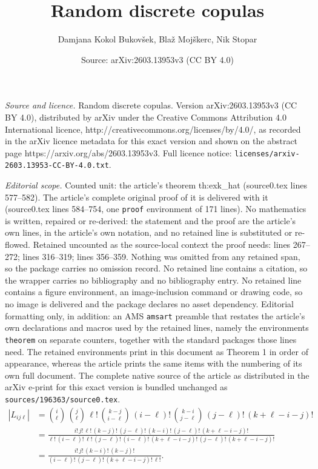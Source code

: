 \documentclass[10pt,a4paper]{amsart}
\title{Random discrete copulas}
\author{Damjana Kokol Bukov\v{s}ek, Bla\v{z} Moj\v{s}kerc, Nik Stopar}
\date{Source: arXiv:2603.13953v3 (CC BY 4.0)}
\begin{document}
\maketitle

\noindent\emph{Source and licence.} Random discrete copulas. Version arXiv:2603.13953v3 (CC BY 4.0), distributed by arXiv under the Creative Commons Attribution 4.0 International licence, http://creativecommons.org/licenses/by/4.0/, as recorded in the arXiv licence metadata for this exact version and shown on the abstract page https://arxiv.org/abs/2603.13953v3. Full licence notice: \texttt{licenses/arxiv-2603.13953-CC-BY-4.0.txt}.\par\smallskip

\noindent\textit{Editorial scope.} Counted unit: the article's theorem th:exk\_hat (source0.tex lines 577--582). The article's complete original proof of it is delivered with it (source0.tex lines 584--754, one \texttt{proof} environment of 171 lines). No mathematics is written, repaired or re-derived: the statement and the proof are the article's own lines, in the article's own notation, and no retained line is substituted or re-flowed.  Retained uncounted as the source-local context the proof needs: lines 267--272; lines 316--319; lines 356--359.  Nothing was omitted from any retained span, so the package carries no omission record.  No retained line contains a citation, so the wrapper carries no bibliography and no bibliography entry.  No retained line contains a figure environment, an image-inclusion command or drawing code, so no image is delivered and the package declares no asset dependency.  Editorial formatting only, in addition: an AMS \texttt{amsart} preamble that restates the article's own declarations and macros used by the retained lines, namely the environments \texttt{theorem} on separate counters, together with the standard packages those lines need.  The retained environments print in this document as Theorem 1 in order of appearance, whereas the article prints the same items with the numbering of its own full document.  The complete native source of the article as distributed in the arXiv e-print for this exact version is bundled unchanged as \texttt{sources/196363/source0.tex}.
\begin{align}
    |L_{ij\ell}|
    &= \binom{i}{\ell} \, \binom{j}{\ell} \, \ell! \, \binom{k-j}{i-\ell} \, (i-\ell)! \, \binom{k-i}{j-\ell} \, (j-\ell)! \,(k+\ell-i-j)! \nonumber\\
    &= \frac{i! \,j! \, \ell!\, (k-j)! \,(j-\ell)! \,(k-i)! \,(j-\ell)! \, (k+\ell-i-j)!}{\ell! \, (i-\ell)! \, \ell! \, (j-\ell)! \, (i-\ell)! \, (k+\ell-i-j)! \, (j-\ell)! \, (k+\ell-i-j)!} \label{eq:L_ijl_size}\\
    &= \frac{i! \, j! \, (k-i)! \, (k-j)!}{(i-\ell)! \, (j-\ell)! \, (k+\ell-i-j)! \, \ell!}. \nonumber
\end{align}
\end{document}
